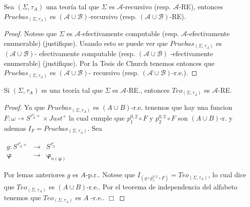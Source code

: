   \begin{lemma} \label{lemma_112}
    \PN Sea $(\Sigma, \tau_{A})$ una teoría tal que $\Sigma$ es $\mathcal{A}$-recursivo (resp. $\mathcal{A}$-RE),
    entonces $Pruebas_{(\Sigma, \tau_{A})}$ es $(\mathcal{A} \cup \mathcal{B})$-recursivo (resp. $(\mathcal{A} \cup
    \mathcal{B})$-RE).
  \end{lemma}
  \begin{proof}
    \PN Notese que $\Sigma$ es $\mathcal{A}$-efectivamente computable (resp. $\mathcal{A}$-efectivamente enumerable)
    (justifique). Usando esto se puede ver que $Pruebas_{(\Sigma, \tau _{A})}$ es $(\mathcal{A} \cup \mathcal{B})$-
    efectivamente computable (resp. $(\mathcal{A}\cup \mathcal{B})$ -efectivamente enumerable) (justifique).
    Por la Tesis de Church tenemos entonces que $Pruebas_{(\Sigma ,\tau _{A})}$ es $(\mathcal{A}\cup \mathcal{B} )$-
    recursivo (resp. $(\mathcal{A}\cup \mathcal{B})$-r.e.).
  \end{proof}

  \begin{lemma} \label{lemma_113}
    \PN Si $(\Sigma, \tau_{A})$ es una teoría tal que $\Sigma$ es $\mathcal{A}$-RE., entonces $Teo_{(\Sigma, \tau_{A})}$
    es $\mathcal{A}$-RE.
  \end{lemma}
  \begin{proof}
    Ya que $Pruebas_{(\Sigma ,\tau _{A})}$ es $(A\cup B)$-r.e. tenemos que hay una funcion $F:\omega \rightarrow S^{\tau_{A}^{e}+}\times Just^{+}$ la cual cumple que $p_{1}^{0,2}\circ F$ y $p_{2}^{0,2}\circ F$ son $(A\cup B)$-r. y ademas $I_{F}=Pruebas_{(\Sigma ,\tau _{A})}$. Sea

    $\displaystyle \begin{array}{ccc} g:S^{\tau_{A}^{e}+} & \rightarrow & S^{\tau_{A}^{e}} \\ \mathbf{\varphi } & \rightarrow & \mathbf{\varphi }_{n(\mathbf{\varphi })} \end{array} $

    Por lemas anteriores $g$ es $A$-p.r.. Notese que $I_{(g\circ p_{1}^{0,2}\circ F)}=Teo_{(\Sigma ,\tau _{A})}$, lo cual dice que $ Teo_{(\Sigma ,\tau _{A})}$ es $(A\cup B)$-r.e.. Por el teorema de independencia del alfabeto tenemos que $Teo_{(\Sigma ,\tau _{A})}$ es $A$ -r.e.. $\Box$
  \end{proof}

